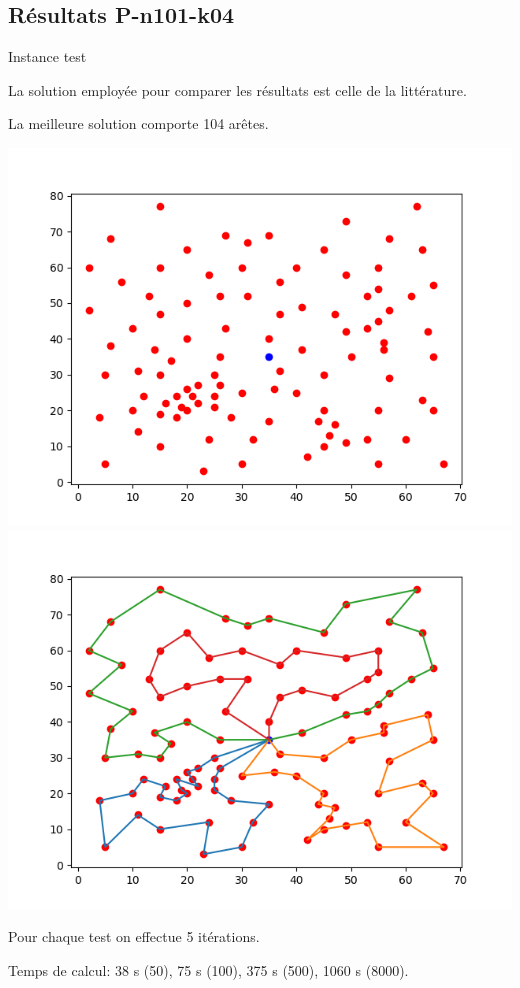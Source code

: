 \documentclass{beamer}
\begin{document}
\subsection{Résultats P-n101-k04}

\begin{frame}{Instance test}

La solution employée pour comparer les résultats est celle de la littérature.

La meilleure solution comporte 104 arêtes.

\includegraphics[scale=0.3]{Instance10104.png}
\includegraphics[scale=0.3]{Solution10104.png}

Pour chaque test on effectue 5 itérations.

Temps de calcul: 38 s (50), 75 s (100), 375 s (500), 1060 s (8000). 
\end{frame}
\end{document}

